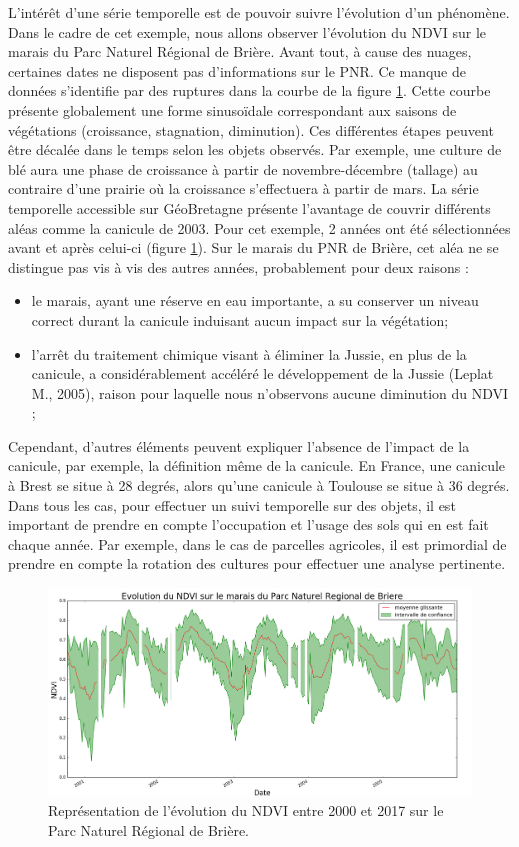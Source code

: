 \documentclass[10pt,a4paper]{article}
\begin{document}
L'intérêt d'une série temporelle est de pouvoir suivre l'évolution d'un phénomène. Dans le cadre de cet exemple, nous allons observer l'évolution du NDVI sur le marais du Parc Naturel Régional de Brière. Avant tout, à cause des nuages, certaines dates ne disposent pas d'informations sur le PNR. Ce manque de données s'identifie par des ruptures dans la courbe de la figure \ref{TS_NDVI}.\smallbreak
Cette courbe présente globalement une forme sinusoïdale correspondant aux saisons de végétations (croissance, stagnation, diminution). Ces différentes étapes peuvent être décalée dans le temps selon les objets observés. Par exemple, une culture de blé aura une phase de croissance à partir de novembre-décembre (tallage) au contraire d'une prairie où la croissance s'effectuera à partir de mars.\smallbreak
La série temporelle accessible sur GéoBretagne présente l'avantage de couvrir différents aléas comme la canicule de 2003. Pour cet exemple, 2 années ont été sélectionnées avant et après celui-ci (figure \ref{TS_NDVI}).\smallbreak
Sur le marais du PNR de Brière, cet aléa ne se distingue pas vis à vis des autres années, probablement pour deux raisons :
\begin{itemize}
\item le marais, ayant une réserve en eau importante, a su conserver un niveau correct durant la canicule induisant aucun impact sur la végétation;
\item l'arrêt du traitement chimique visant à éliminer la Jussie, en plus de la canicule, a considérablement accéléré le développement de la Jussie (Leplat M., 2005), raison pour laquelle nous n'observons aucune diminution du NDVI ;
\end{itemize}
Cependant, d'autres éléments peuvent expliquer l'absence de l'impact de la canicule, par exemple, la définition même de la canicule. En France, une canicule à Brest se situe à 28 degrés, alors qu'une canicule à Toulouse se situe à 36 degrés.\smallbreak
Dans tous les cas, pour effectuer un suivi temporelle sur des objets, il est important de prendre en compte l'occupation et l'usage des sols qui en est fait chaque année. Par exemple, dans le cas de parcelles agricoles, il est primordial de prendre en compte la rotation des cultures pour effectuer une analyse pertinente.

\begin{figure}[!h]
\centering
\includegraphics[scale=0.29]{img/NDVI_Briere.png}
\caption{Représentation de l'évolution du NDVI entre 2000 et 2017 sur le Parc Naturel Régional de Brière.}
\label{TS_NDVI}
\end{figure}
\end{document}
